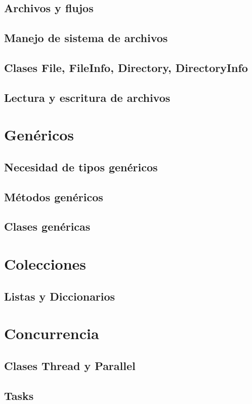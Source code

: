 \documentclass[12pt,a4paper]{report}
\begin{document}
\section{Archivos y flujos}
\section{Manejo de sistema de archivos}
\section{Clases File, FileInfo, Directory, DirectoryInfo}
\section{Lectura y escritura de archivos}

\chapter{Genéricos}
\section{Necesidad de tipos genéricos}
\section{Métodos genéricos}
\section{Clases genéricas}

\chapter{Colecciones}
\section{Listas y Diccionarios}

\chapter{Concurrencia}
\section{Clases Thread y Parallel}
\section{Tasks}
\end{document}
